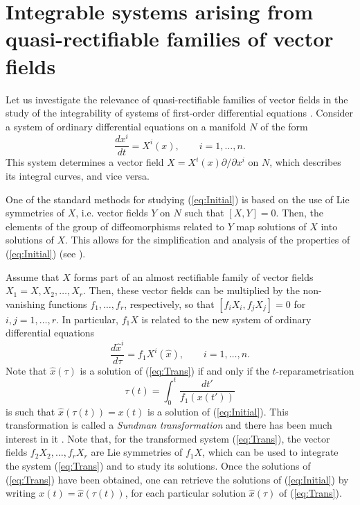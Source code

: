 \documentclass[12pt]{article}
\theoremstyle{plain}
\theoremstyle{definition}
\numberwithin{equation}{section}
\begin{document}
\section{Integrable systems arising from  quasi-rectifiable families of vector fields}\label{Sec::Int}

Let us investigate the relevance of quasi-rectifiable families of vector fields in the study of the integrability of systems of first-order differential equations \cite{LS93}. Consider a system of ordinary differential equations on a manifold $N$ of the form
\begin{equation}\label{eq:Initial}
\frac{dx^i}{dt}=X^i(x),\qquad i=1,\ldots,n.
\end{equation}
This system determines a vector field $X=X^i(x)\partial/\partial x^i$ on $N$, which describes its integral curves, and vice versa. 

One of the standard methods for studying (\ref{eq:Initial}) is based on the use of Lie symmetries of $X$, i.e. vector fields $Y$ on $N$ such that $[X,Y]=0$. Then, the elements of the group of diffeomorphisms related to $Y$ map solutions of $X$ into solutions of $X$. This allows for the simplification and analysis of the properties of  (\ref{eq:Initial}) (see \cite{Ol83}).

Assume that $X$ forms part of an almost  rectifiable family of vector fields $X_1=X,X_2,\ldots,X_r$. Then, these vector fields can be multiplied by the non-vanishing functions $f_1,\ldots,f_r$, respectively, so that $[f_iX_i,f_jX_j]=0$ for $i,j=1,\ldots,r$. In particular,  $f_1X$ is related to the new system of ordinary differential equations
\begin{equation}\label{eq:Trans}
\frac{d\hat x^i}{d\tau}=f_1X^i(\hat x),\qquad i=1,\ldots,n.
\end{equation}
Note that $\hat x(\tau )$ is a solution of (\ref{eq:Trans}) if and only if the $t$-reparametrisation 
$$
\tau(t)=\int_0^t \frac{dt'}{f_1(x(t'))}
$$
is such that $
\hat{x}(\tau(t))=x(t)
$ is a solution of (\ref{eq:Initial}). This transformation is called a {\it Sundman transformation} and there has been much interest in it \cite{CMM22,CMM23,EE04}. Note that, for the transformed system (\ref{eq:Trans}), the vector fields $f_2X_2,\ldots,f_rX_r$ are Lie symmetries of $f_1X$, which can be used to integrate the system (\ref{eq:Trans}) and to study its solutions. Once the solutions of (\ref{eq:Trans}) have been obtained, one can retrieve the solutions of (\ref{eq:Initial}) by writing $x(t)=\hat{x}(\tau(t))$, for each particular solution $
\hat{x}(\tau)$ of (\ref{eq:Trans}).
\end{document}
